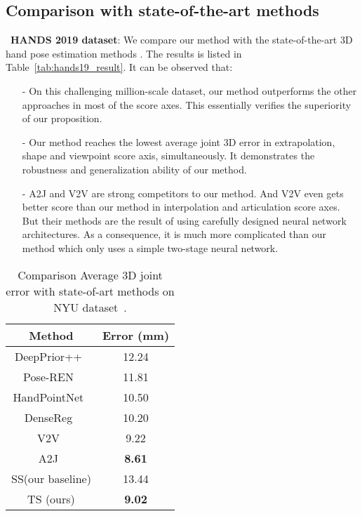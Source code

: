 \documentclass{article}
\begin{document}
\subsection{Comparison with state-of-the-art methods}\label{sec:sota}

~\textbf{HANDS 2019 dataset}:
We compare our method with the state-of-the-art 3D hand pose estimation methods
. The results is listed in Table~\ref{tab:hands19_result}. It can be observed that:
\begin{itemize}
\item[-] On this challenging million-scale dataset, our method outperforms the other approaches in most of the score axes. This essentially verifies the superiority of our proposition.
\item[-] Our method reaches the lowest average joint 3D error in extrapolation, shape and viewpoint score axis, simultaneously. It demonstrates the robustness and generalization ability of our method.
\item[-] A2J and V2V are strong competitors to our method. And V2V even gets better score than our method in interpolation and articulation score axes. But their methods are the result of using carefully designed neural network architectures. As a consequence, it is much more complicated than our method which only uses a simple two-stage neural network. 
\end{itemize}


\begin{table}
\centering
\begin{tabular}{cc}
\hline
Method & Error (mm)  \\ \hline
DeepPrior++~\cite{oberweger2017deepprior++} & 12.24 \\
Pose-REN~\cite{chen2019pose} & 11.81 \\
HandPointNet~\cite{ge2018hand} & 10.50 \\
DenseReg~\cite{wan2018dense} & 10.20 \\
V2V~\cite{moon2018v2v} & 9.22 \\
A2J~\cite{xiong2019a2j} & \textbf{8.61}  \\
\hline
SS(our baseline) & 13.44 \\
TS (ours) & \textbf{9.02}  \\ 
\hline
\end{tabular}
\caption{Comparison Average 3D joint error with state-of-art methods on NYU dataset~\protect\cite{tompson2014real}.}
\label{tab:nyu_result} 
\end{table}
\end{document}

